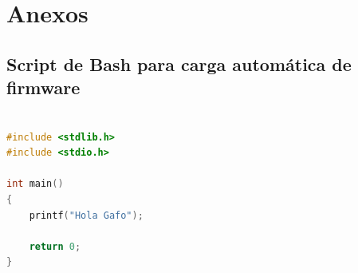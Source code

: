 \documentclass[paper=letter,oneside,fontsize=11pt, parskip=full]{scrartcl}
\begin{document}
	\section{Anexos}	
		
		\subsection{Script de Bash para carga automática de firmware}
	
			\begin{lstlisting}[language=c,caption={Listado programa}]
	
#include <stdlib.h>
#include <stdio.h>

int main()
{
	printf("Hola Gafo");
	
	return 0;
}

		\end{lstlisting}
\end{document}
